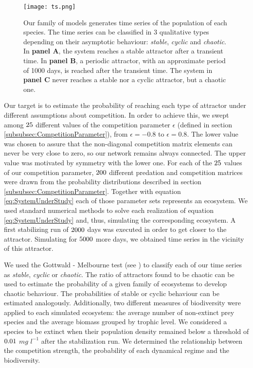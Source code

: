 \begin{figure}
	\begin{center}
		\texttt{[image: ts.png]}
	\end{center}
	\caption{Our family of models generates time series of the population of each species. The time series can be classified in $3$ qualitative types depending on their asymptotic behaviour: \textit{stable}, \textit{cyclic} and \textit{chaotic}. In \textbf{panel A}, the system reaches a stable attractor after a transient time. In \textbf{panel B}, a periodic attractor, with an approximate period of 1000 days, is reached after the transient time. The system in \textbf{panel C} never reaches a stable nor a cyclic attractor, but a chaotic one.}
	\label{fig:TimeSeries}
\end{figure}

Our target is to estimate the probability of reaching each type of attractor under different assumptions about competition. In order to achieve this, we swept among $25$ different values of the competition parameter $\epsilon$ (defined in section \ref{subsubsec:CompetitionParameter}), from $\epsilon = -0.8$ to $\epsilon = 0.8$. The lower value was chosen to assure that the non-diagonal competition matrix elements can never be very close to zero, so our network remains always connected. The upper value was motivated by symmetry with the lower one. For each of the $25$ values of our competition parameter, $200$ different predation and competition matrices were drawn from the probability distributions described in section \ref{subsubsec:CompetitionParameter}. Together with equation \eqref{eq:SystemUnderStudy} each of those parameter sets represents an ecosystem. We used standard numerical methods to solve each realization of equation \eqref{eq:SystemUnderStudy} and, thus, simulating the corresponding ecosystem. A first stabilizing run of $ 2000 $ days was executed in order to get closer to the attractor. Simulating for $ 5000 $ more days, we obtained time series in the vicinity of this attractor.

We used the Gottwald - Melbourne test (see \citet{Gottwald2009}) to classify each of our time series as \textit{stable}, \textit{cyclic} or \textit{chaotic}. The ratio of attractors found to be chaotic can be used to estimate the probability of a given family of ecosystems to develop chaotic behaviour. The probabilities of stable or cyclic behaviour can be estimated analogously. Additionally, two different measures of biodiversity were applied to each simulated ecosystem: the average number of non-extinct prey species and the average biomass grouped by trophic level. We considered a species to be extinct when their population density remained below a threshold of $0.01$ $mg$ $l^{-1}$ after the stabilization run. We determined the relationship between the competition strength, the probability of each dynamical regime and the biodiversity.

